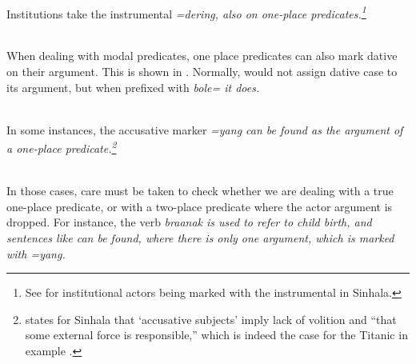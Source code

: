  \\
Institutions take the instrumental \em =dering\em, also on one-place predicates.\footnote{See \citet[791]{Gair2003} for institutional actors being marked with the instrumental in Sinhala.}

 \\
When dealing with modal predicates, one place predicates can also mark dative on their argument. This is shown in . Normally,  would not assign dative case to its argument, but when prefixed with \em bole= \em it does.

 \\
In some instances, the accusative marker \em =yang \em can be found as the argument of a one-place predicate.\footnote{\citet[791]{Gair2003} states for Sinhala that `accusative subjects' imply lack of volition and ``that some external force is responsible,'' which is indeed the case for the Titanic in example .}



 \\
In those cases, care must be taken to check whether we are dealing with a true one-place predicate, or with a two-place predicate where the actor argument is dropped. For instance, the verb \em braanak \em is used to refer to child birth, and sentences like  can be found, where there is only one argument, which is marked with \em =yang\em.



